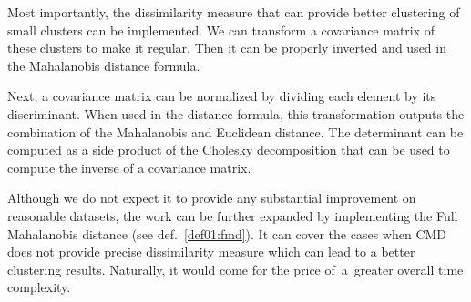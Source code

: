 Most importantly, the dissimilarity measure that can provide better clustering of small clusters can be implemented. We can transform a covariance matrix of  these clusters to make it regular. Then it can be properly inverted and used in the Mahalanobis distance formula.

Next, a covariance matrix can be normalized by dividing each element by its discriminant. When used in the distance formula, this transformation outputs the combination of the Mahalanobis and Euclidean distance. The determinant can be computed as a side product of the Cholesky decomposition that can be used to compute the inverse of a covariance matrix.

Although we do not expect it to provide any substantial improvement on reasonable datasets, the work can be further expanded by implementing the Full Mahalanobis distance (see def.~\ref{def01:fmd}). It can cover the cases when CMD does not provide precise dissimilarity measure which can lead to a better clustering results. Naturally, it would come for the price of~a~greater overall time complexity. 